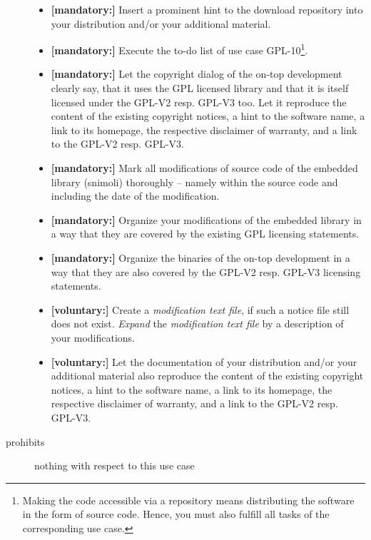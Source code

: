 \begin{description}
\begin{itemize}
  \item \textbf{[mandatory:]} Insert a prominent hint to the download repository
  into your distribution and/or your additional material.
    
  \item \textbf{[mandatory:]} Execute the to-do list of use case GPL-10\footnote{
  Making the code accessible via a repository means distributing the software in
  the form of source code. Hence, you must also fulfill all tasks of the
  corresponding use case.}.

  \item \textbf{[mandatory:]} Let the copyright dialog of the on-top development
  clearly say, that it uses the GPL licensed library and that it is itself
  licensed under the GPL-V2 resp. GPL-V3 too. Let it reproduce the content of
  the existing copyright notices, a hint to the software name, a link to its
  homepage, the respective disclaimer of warranty, and a link to the GPL-V2
  resp. GPL-V3.
  
  \item \textbf{[mandatory:]} Mark all modifications of source code of the
  embedded library (snimoli) thoroughly -- namely within the source code and
  including the date of the modification.
  
  \item \textbf{[mandatory:]} Organize your modifications of the embedded
  library in a way that they are covered by the existing GPL licensing
  statements. 
  
  \item \textbf{[mandatory:]} Organize the binaries of the on-top development in
  a way that they are also covered by the GPL-V2 resp. GPL-V3 licensing
  statements.
       
  \item \textbf{[voluntary:]} Create a \emph{modification text file}, if such a
  notice file still does not exist. \emph{Expand} the \emph{modification text
  file} by a description of your modifications.
    
  \item \textbf{[voluntary:]} Let the documentation of your distribution and/or
  your additional material also reproduce the content of the existing copyright
  notices, a hint to the software name, a link to its homepage, the respective
  disclaimer of warranty, and a link to the GPL-V2 resp.
  GPL-V3.
  
\end{itemize}

\item[prohibits] nothing with respect to this use case

\end{description}

